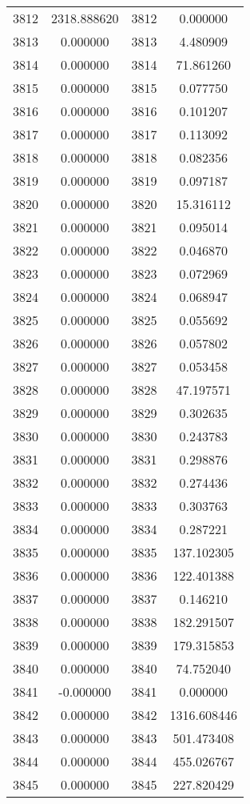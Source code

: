 \documentclass[12pt]{article}
\begin{document}
\begin{longtable}{@{}cccc@{}}
3812 & 2318.888620 & 3812 & 0.000000 \\
3813 & 0.000000 & 3813 & 4.480909 \\
3814 & 0.000000 & 3814 & 71.861260 \\
3815 & 0.000000 & 3815 & 0.077750 \\
3816 & 0.000000 & 3816 & 0.101207 \\
3817 & 0.000000 & 3817 & 0.113092 \\
3818 & 0.000000 & 3818 & 0.082356 \\
3819 & 0.000000 & 3819 & 0.097187 \\
3820 & 0.000000 & 3820 & 15.316112 \\
3821 & 0.000000 & 3821 & 0.095014 \\
3822 & 0.000000 & 3822 & 0.046870 \\
3823 & 0.000000 & 3823 & 0.072969 \\
3824 & 0.000000 & 3824 & 0.068947 \\
3825 & 0.000000 & 3825 & 0.055692 \\
3826 & 0.000000 & 3826 & 0.057802 \\
3827 & 0.000000 & 3827 & 0.053458 \\
3828 & 0.000000 & 3828 & 47.197571 \\
3829 & 0.000000 & 3829 & 0.302635 \\
3830 & 0.000000 & 3830 & 0.243783 \\
3831 & 0.000000 & 3831 & 0.298876 \\
3832 & 0.000000 & 3832 & 0.274436 \\
3833 & 0.000000 & 3833 & 0.303763 \\
3834 & 0.000000 & 3834 & 0.287221 \\
3835 & 0.000000 & 3835 & 137.102305 \\
3836 & 0.000000 & 3836 & 122.401388 \\
3837 & 0.000000 & 3837 & 0.146210 \\
3838 & 0.000000 & 3838 & 182.291507 \\
3839 & 0.000000 & 3839 & 179.315853 \\
3840 & 0.000000 & 3840 & 74.752040 \\
3841 & -0.000000 & 3841 & 0.000000 \\
3842 & 0.000000 & 3842 & 1316.608446 \\
3843 & 0.000000 & 3843 & 501.473408 \\
3844 & 0.000000 & 3844 & 455.026767 \\
3845 & 0.000000 & 3845 & 227.820429 \\

\end{longtable}
\end{document}

